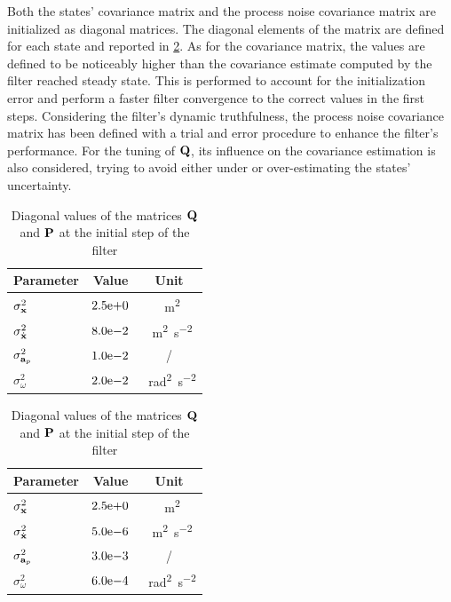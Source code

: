 Both the states' covariance matrix and the process noise covariance matrix are initialized as diagonal matrices. The diagonal elements of the matrix are defined for each state and reported in \cref{tab:PQinit}.
As for the covariance matrix, the values are defined to be noticeably higher than the covariance estimate computed by the filter reached steady state. This is performed to account for the initialization error and perform a faster filter convergence to the correct values in the first steps. Considering the filter's dynamic truthfulness, the process noise covariance matrix has been defined with a trial and error procedure to enhance the filter's performance. For the tuning of $\mathrm{\textbf{Q}}$, its influence on the covariance estimation is also considered, trying to avoid either under or over-estimating the states' uncertainty.\\
\begin{table}[!h]
    \begin{subtable}[h]{0.45\textwidth}
        \centering
        \begin{tabular}{l  c c}
        Parameter & Value & Unit\\ \hline \hline
        $\sigma_{\mathrm{\textbf{x}}}^2 $ & ${2.5}\mathrm{e}{+0}$ & \SI{}{\meter^2}\\\hline
        $\sigma_{\dot{\mathrm{\textbf{x}}}}^2 $ & ${8.0}\mathrm{e}{-2}$ & \SI{}{\meter^2\per\second^2}\\\hline
        $\sigma_{\mathrm{\textbf{a}}_p}^2 $ & ${1.0}\mathrm{e}{-2}$ & /\\\hline
        $\sigma_{\omega}^2 $ & ${2.0}\mathrm{e}{-2}$ & \SI{}{\radian^2\per\second^2}\\\hline
        \end{tabular}
        \caption{Initial covariance matrix settings}
        \label{tab:P0}
     \end{subtable}\hfill
    \begin{subtable}[h]{0.45\textwidth}
        \centering
        \begin{tabular}{l  c c}
        Parameter & Value & Unit\\ \hline \hline
        $\sigma_{\mathrm{\textbf{x}}}^2 $ & ${2.5}\mathrm{e}{+0}$ & \SI{}{\meter^2}\\\hline
        $\sigma_{\dot{\mathrm{\textbf{x}}}}^2 $ & ${5.0}\mathrm{e}{-6}$ & \SI{}{\meter^2\per\second^2}\\\hline
        $\sigma_{\mathrm{\textbf{a}}_p}^2 $ & ${3.0}\mathrm{e}{-3}$ & /\\\hline
        $\sigma_{\omega}^2 $ & ${6.0}\mathrm{e}{-4}$ & \SI{}{\radian^2\per\second^2}\\\hline
        
       \end{tabular}
       \caption{Process noise covariance diagonal elements}
       \label{tab:Q0}
    \end{subtable}
     \caption{Diagonal values of the matrices $\mathrm{\textbf{Q}}$ and $\mathrm{\textbf{P}}$ at the initial step of the filter}
     \label{tab:PQinit}
\end{table}
